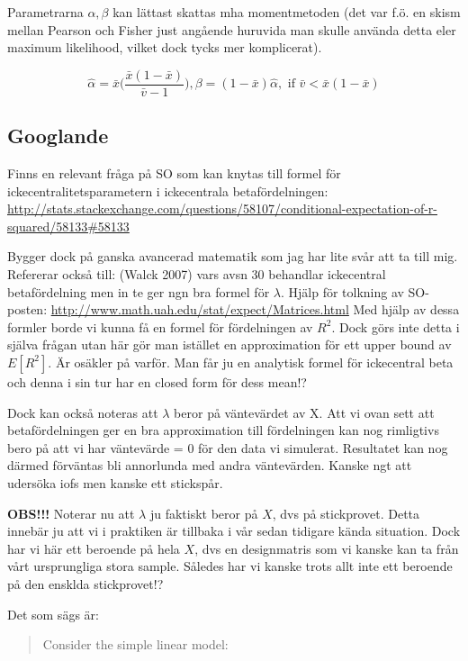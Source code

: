 \documentclass[]{article}
\begin{document}
Parametrarna \(\alpha, \beta\) kan lättast skattas mha momentmetoden
(det var f.ö. en skism mellan Pearson och Fisher just angående huruvida
man skulle använda detta eler maximum likelihood, vilket dock tycks mer
komplicerat).

\[\hat{\alpha} = \bar{x}\big( \frac{\bar{x}(1-\bar{x})}{\bar{v}-1}\big), \beta = (1-\bar{x})\hat{\alpha}, \textrm{ if } \bar{v} < \bar{x}(1-\bar{x})\]

\subsection{Googlande}\label{googlande}

Finns en relevant fråga på SO som kan knytas till formel för
ickecentralitetsparametern i ickecentrala betafördelningen:
\url{http://stats.stackexchange.com/questions/58107/conditional-expectation-of-r-squared/58133\#58133}

Bygger dock på ganska avancerad matematik som jag har lite svår att ta
till mig. Refererar också till: (Walck 2007) vars avsn 30 behandlar
ickecentral betafördelning men in te ger ngn bra formel för \(\lambda\).
Hjälp för tolkning av SO-posten:
\url{http://www.math.uah.edu/stat/expect/Matrices.html} Med hjälp av
dessa formler borde vi kunna få en formel för fördelningen av \(R^2\).
Dock görs inte detta i själva frågan utan här gör man istället en
approximation för ett upper bound av \(E[R^2]\). Är osäkler på varför.
Man får ju en analytisk formel för ickecentral beta och denna i sin tur
har en closed form för dess mean!?

Dock kan också noteras att \(\lambda\) beror på väntevärdet av X. Att vi
ovan sett att betafördelningen ger en bra approximation till
fördelningen kan nog rimligtivs bero på att vi har väntevärde = 0 för
den data vi simulerat. Resultatet kan nog därmed förväntas bli
annorlunda med andra väntevärden. Kanske ngt att udersöka iofs men
kanske ett stickspår.

\textbf{OBS!!!} Noterar nu att \(\lambda\) ju faktiskt beror på \(X\),
dvs på stickprovet. Detta innebär ju att vi i praktiken är tillbaka i
vår sedan tidigare kända situation. Dock har vi här ett beroende på hela
\(X\), dvs en designmatris som vi kanske kan ta från vårt ursprungliga
stora sample. Således har vi kanske trots allt inte ett beroende på den
ensklda stickprovet!?

Det som sägs är:

\begin{quote}
Consider the simple linear model:
\end{quote}
\end{document}
